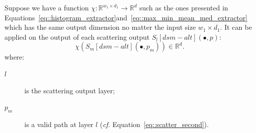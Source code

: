             Suppose we have a function \(\chi: \mathbb{R}^{w_1 \times d_1} \rightarrow \mathbb{R}^d\) such as the ones presented in Equations~\ref{eq::histogram_extractor}and~\ref{eq::max_min_mean_med_extractor} which has the same output dimension no matter the input size \(w_1 \times d_1\).
            It can be applied on the output of each scattering output \(S_l[dsm - alt](\bullet, p)\):
            \begin{equation}
                \label{eq::reduced_scattering}
                \chi \left(S_m[dsm - alt]\left(\bullet, p_m\right)\right) \in \mathbb{R}^d.
            \end{equation}
            where:
            \begin{description}
                \item[\(l\)] is the scattering output layer;
                \item[\(p_m\)] is a valid path at layer \(l\) (\textit{cf.} Equation~\ref{eq::scatter_second}). 
            \end{description}
            
